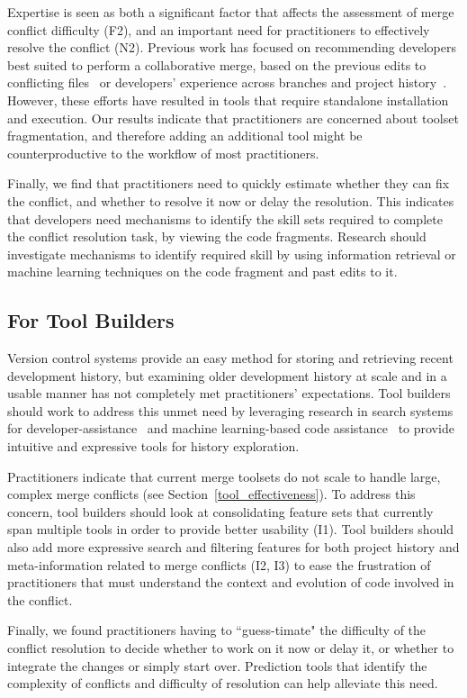 Expertise is seen as both a significant factor that affects the assessment of merge conflict difficulty (F2), and an important need for practitioners to effectively resolve the conflict (N2).
Previous work has focused on recommending developers best suited to perform a collaborative merge, based on the previous edits to conflicting files~\cite{dasilva2015niche} or developers' experience across branches and project history~\cite{CostaSarma}. However, these efforts have resulted in tools that require standalone installation and execution. Our results indicate that practitioners are concerned about toolset fragmentation, and therefore adding an additional tool might be counterproductive to the workflow of most practitioners. 

Finally, we find that practitioners need to quickly estimate whether they can fix the conflict, and whether to resolve it now or delay the resolution. This indicates that developers need mechanisms to identify the skill sets required to complete the conflict resolution task, by viewing the code fragments. Research should investigate mechanisms to identify required skill by using information retrieval or machine learning techniques on the code fragment and past edits to it. 

\subsection{For Tool Builders}
Version control systems provide an easy method for storing and retrieving recent development history, but examining older development history at scale and in a usable manner has not completely met practitioners' expectations.
Tool builders should work to address this unmet need by leveraging research in search systems for developer-assistance~\cite{nabi2016putting} and machine learning-based code assistance~\cite{bradley2011history_exploration} to provide intuitive and expressive tools for history exploration.

Practitioners indicate that current merge toolsets do not scale to handle large, complex merge conflicts (see Section~\ref{tool_effectiveness}).
To address this concern, tool builders should look at consolidating feature sets that currently span multiple tools in order to provide better usability (I1).
Tool builders should also add more expressive search and filtering features for both project history and meta-information related to merge conflicts (I2, I3) to ease the frustration of practitioners that must understand the context and evolution of code involved in the conflict.

Finally, we found practitioners having to ``guess-timate" the difficulty of the conflict resolution to decide whether to work on it now or delay it, or whether to integrate the changes or simply start over. Prediction tools that identify the complexity of conflicts and difficulty of resolution can help alleviate this need.
